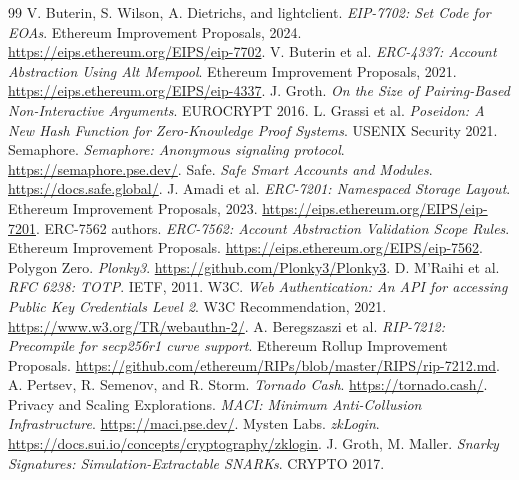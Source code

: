 \documentclass[11pt]{article}
\theoremstyle{definition}
\theoremstyle{plain}
\begin{document}
\begin{thebibliography}{99}
 V. Buterin, S. Wilson, A. Dietrichs, and lightclient. \emph{EIP-7702: Set Code for EOAs}. Ethereum Improvement Proposals, 2024. \url{https://eips.ethereum.org/EIPS/eip-7702}.
 V. Buterin et al. \emph{ERC-4337: Account Abstraction Using Alt Mempool}. Ethereum Improvement Proposals, 2021. \url{https://eips.ethereum.org/EIPS/eip-4337}.
 J. Groth. \emph{On the Size of Pairing-Based Non-Interactive Arguments}. EUROCRYPT 2016.
 L. Grassi et al. \emph{Poseidon: A New Hash Function for Zero-Knowledge Proof Systems}. USENIX Security 2021.
 Semaphore. \emph{Semaphore: Anonymous signaling protocol}. \url{https://semaphore.pse.dev/}.
 Safe. \emph{Safe Smart Accounts and Modules}. \url{https://docs.safe.global/}.
 J. Amadi et al. \emph{ERC-7201: Namespaced Storage Layout}. Ethereum Improvement Proposals, 2023. \url{https://eips.ethereum.org/EIPS/eip-7201}.
 ERC-7562 authors. \emph{ERC-7562: Account Abstraction Validation Scope Rules}. Ethereum Improvement Proposals. \url{https://eips.ethereum.org/EIPS/eip-7562}.
 Polygon Zero. \emph{Plonky3}. \url{https://github.com/Plonky3/Plonky3}.
 D. M'Raihi et al. \emph{RFC 6238: TOTP}. IETF, 2011.
 W3C. \emph{Web Authentication: An API for accessing Public Key Credentials Level 2}. W3C Recommendation, 2021. \url{https://www.w3.org/TR/webauthn-2/}.
 A. Beregszaszi et al. \emph{RIP-7212: Precompile for secp256r1 curve support}. Ethereum Rollup Improvement Proposals. \url{https://github.com/ethereum/RIPs/blob/master/RIPS/rip-7212.md}.
 A. Pertsev, R. Semenov, and R. Storm. \emph{Tornado Cash}. \url{https://tornado.cash/}.
 Privacy and Scaling Explorations. \emph{MACI: Minimum Anti-Collusion Infrastructure}. \url{https://maci.pse.dev/}.
 Mysten Labs. \emph{zkLogin}. \url{https://docs.sui.io/concepts/cryptography/zklogin}.
 J. Groth, M. Maller. \emph{Snarky Signatures: Simulation-Extractable SNARKs}. CRYPTO 2017.
\end{thebibliography}
\end{document}
